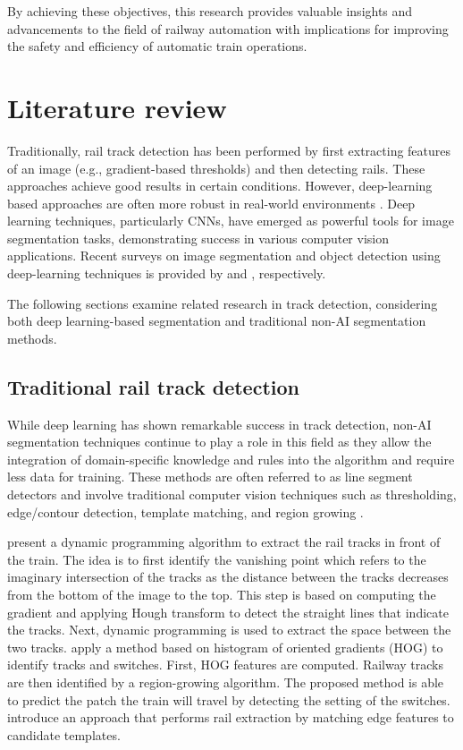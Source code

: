 \documentclass[Master,MDS,english]{BASE/twbook} %
\begin{document}
By achieving these objectives, this research provides valuable insights and advancements to the field of railway automation with implications for improving the safety and efficiency of automatic train operations.




\chapter{Literature review} %

Traditionally, rail track detection has been performed by first extracting features of an image (e.g., gradient-based thresholds) and then detecting rails. These approaches achieve good results in certain conditions. However, deep-learning based approaches are often more robust in real-world environments \citep{7350873, 8859360, 10.1145/3503161.3548050}.
Deep learning techniques, particularly CNNs, have emerged as powerful tools for image segmentation tasks, demonstrating success in various computer vision applications. Recent surveys on image segmentation and object detection using deep-learning techniques is provided by \cite{cmc.2023.032757} and \cite{ZAIDI2022103514}, respectively.

The following sections examine related research in track detection, considering both deep learning-based segmentation and traditional non-AI segmentation methods.



\section{Traditional rail track detection}

While deep learning has shown remarkable success in track detection, non-AI segmentation techniques continue to play a role in this field as they allow the integration of domain-specific knowledge and rules into the algorithm and require less data for training. These methods are often referred to as line segment detectors and involve traditional computer vision techniques such as thresholding, edge/contour detection, template matching, and region growing \citep{4731268, ipol.2012.gjmr-lsd, 8100103, SAHOO1988233, Mittal2022}.

\cite{5309526} present a dynamic programming algorithm to extract the rail tracks in front of the train. The idea is to first identify the vanishing point which refers to the imaginary intersection of the tracks as the distance between the tracks decreases from the bottom of the image to the top.  This step is based on computing the gradient and applying Hough transform to detect the straight lines that indicate the tracks. Next, dynamic programming is used to extract the space between the two tracks.
 \cite{qi2013efficient} apply a method based on histogram of oriented gradients (HOG) to identify tracks and switches. First, HOG features are computed.  Railway tracks are then identified by a region-growing algorithm. The proposed method is able to predict the patch the train will travel by detecting the setting of the switches. 
\cite{5940410} introduce an approach that performs rail extraction by matching edge features to candidate templates.
\end{document}
